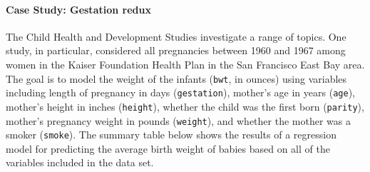 \documentclass[10pt]{article}\usepackage[]{graphicx}\usepackage[]{color}
\begin{document}
% 
% 
% 
% 
% 

\paragraph{Case Study: Gestation redux}

The Child Health and Development Studies investigate a range of topics. One study, in particular, considered all pregnancies between 1960 and 1967 among women in the Kaiser Foundation Health Plan in the San Francisco East Bay area. The goal is to model the weight of the infants (\texttt{bwt}, in ounces) using variables including length of pregnancy in days (\texttt{gestation}), mother's age in years (\texttt{age}), mother's height in inches (\texttt{height}), whether the child was the first born (\texttt{parity}), mother's pregnancy weight in pounds (\texttt{weight}), and whether the mother was a smoker (\texttt{smoke}). 
The summary table below shows the results of a regression model for predicting the average birth weight of babies based on all of the variables included in the data set.
\end{document}
